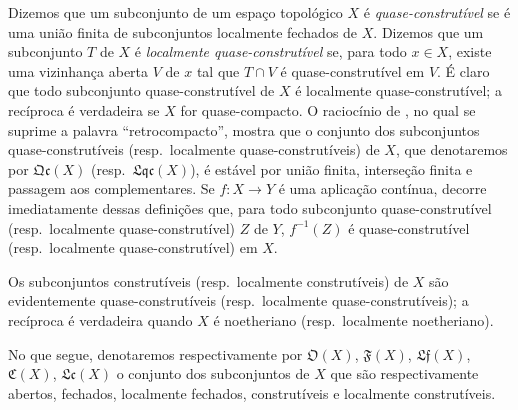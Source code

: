 \begin{env}[10.1.1]
\label{IV.10.1.1}
Dizemos que um subconjunto de um espaço topológico $X$ é
\emph{quase-construtível} se é uma união finita de subconjuntos localmente
fechados de $X$. Dizemos que um subconjunto $T$ de $X$ é \emph{localmente
quase-construtível} se, para todo $x\in X$, existe uma vizinhança aberta $V$ de
$x$ tal que $T\cap V$ é quase-construtível em $V$. É claro que todo subconjunto
quase-construtível de $X$ é localmente quase-construtível; a recíproca é
verdadeira se $X$ for quase-compacto. O raciocínio de
, no qual se suprime a palavra ``retrocompacto'', mostra
que o conjunto dos subconjuntos quase-construtíveis (resp.\ localmente
quase-construtíveis) de $X$, que denotaremos por $\mathfrak{Qc}(X)$ (resp.\
$\mathfrak{Lqc}(X)$), é estável por união finita, interseção finita e passagem
aos complementares. Se $f:X\to Y$ é uma aplicação contínua, decorre
imediatamente dessas definições que, para todo subconjunto quase-construtível
(resp.\ localmente quase-construtível) $Z$ de $Y$, $f^{-1}(Z)$ é
quase-construtível (resp.\ localmente quase-construtível) em $X$.

Os subconjuntos construtíveis (resp.\ localmente construtíveis) de $X$ são
evidentemente quase-construtíveis (resp.\ localmente quase-construtíveis); a
recíproca é verdadeira quando $X$ é noetheriano (resp.\ localmente
noetheriano).

No que segue, denotaremos respectivamente por $\mathfrak{O}(X)$,
$\mathfrak{F}(X)$, $\mathfrak{Lf}(X)$, $\mathfrak{C}(X)$, $\mathfrak{Lc}(X)$ o
conjunto dos subconjuntos de $X$ que são respectivamente abertos, fechados,
localmente fechados, construtíveis e localmente construtíveis.
\end{env}


